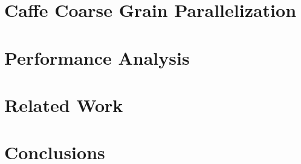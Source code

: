 \documentclass[preprint]{sigplanconf}
\begin{document}
\section{Caffe Coarse Grain Parallelization}
 

\section{Performance Analysis}
 

\section{Related Work}


\section{Conclusions}






{}




%
\end{document}

